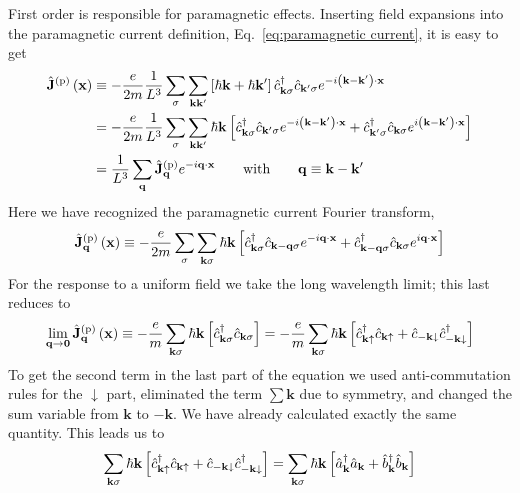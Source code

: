 First order is responsible for paramagnetic effects. Inserting field expansions into the paramagnetic current definition, Eq.~\eqref{eq:paramagnetic current}, it is easy to get
\[
\begin{aligned}
	\hat{\mathbf{J}}^{(\mathrm{p})} \lrR{\mathbf{x}} &\equiv - \frac{e}{2m} \frac{1}{L^3} \sum_\sigma \sum_{\mathbf{k}\mathbf{k}'} 
	\lrS{ \hbar\mathbf{k} + \hbar\mathbf{k}' } \hat{c}_{\mathbf{k}\sigma}^\dagger \hat{c}_{\mathbf{k}'\sigma}
	e^{- i \lrR{\mathbf{k} - \mathbf{k}'} \cdot \mathbf{x}} \\
	&= - \frac{e}{2m} \frac{1}{L^3} \sum_\sigma \sum_{\mathbf{k}\mathbf{k}'} 
	\hbar\mathbf{k}
	\lrS{
		\hat{c}_{\mathbf{k}\sigma}^\dagger \hat{c}_{\mathbf{k}'\sigma}
	 	e^{- i \lrR{\mathbf{k} - \mathbf{k}'} \cdot \mathbf{x}} + \hat{c}_{\mathbf{k}'\sigma}^\dagger \hat{c}_{\mathbf{k}\sigma}
	 	e^{i \lrR{\mathbf{k} - \mathbf{k}'} \cdot \mathbf{x}}
 	} \\
	&= \frac{1}{L^3} \sum_\mathbf{q}
	\hat{\mathbf{J}}^{(\mathrm{p})}_\mathbf{q} e^{- i \mathbf{q} \cdot \mathbf{x}} \quad\qq{with}\quad
	\mathbf{q} \equiv \mathbf{k} - \mathbf{k}'
\end{aligned}
\]
Here we have recognized the paramagnetic current Fourier transform,
\[
	\hat{\mathbf{J}}^{(\mathrm{p})}_\mathbf{q} \left({\mathbf{x}}\right) \equiv - \frac{e}{2m} \sum_\sigma \sum_{\mathbf{k}\sigma} 
	\hbar\mathbf{k} \left[{
		\hat{c}_{\mathbf{k}\sigma}^\dagger \hat{c}_{\mathbf{k}-\mathbf{q}\sigma}
		e^{- i \mathbf{q} \cdot \mathbf{x}} + \hat{c}_{\mathbf{k}-\mathbf{q}\sigma}^\dagger \hat{c}_{\mathbf{k}\sigma}
		e^{i \mathbf{q} \cdot \mathbf{x}}
	}\right]
\]
For the response to a uniform field we take the long wavelength limit; this last reduces to
\[
	\lim_{\mathbf{q}\to\mathbf{0}} \hat{\mathbf{J}}^{(\mathrm{p})}_\mathbf{q} \left({\mathbf{x}}\right) \equiv - \frac{e}{m} \sum_{\mathbf{k}\sigma} 
	\hbar\mathbf{k} \left[{ \hat{c}_{\mathbf{k}\sigma}^\dagger \hat{c}_{\mathbf{k}\sigma} }\right] = - \frac{e}{m} \sum_{\mathbf{k}\sigma} 
	\hbar\mathbf{k} \left[{ 
		\hat{c}_{\mathbf{k}\uparrow}^\dagger \hat{c}_{\mathbf{k}\uparrow} + \hat{c}_{-\mathbf{k}\downarrow} \hat{c}_{-\mathbf{k}\downarrow}^\dagger
	}\right] 
\]
To get the second term in the last part of the equation we used anti-commutation rules for the $\downarrow$ part, eliminated the term $\sum\mathbf{k}$ due to symmetry, and changed the sum variable from $\mathbf{k}$ to $-\mathbf{k}$. We have already calculated exactly the same quantity. This leads us to
\[
	\sum_{\mathbf{k}\sigma} 
	\hbar\mathbf{k} \left[{ 
		\hat{c}_{\mathbf{k}\uparrow}^\dagger \hat{c}_{\mathbf{k}\uparrow} + \hat{c}_{-\mathbf{k}\downarrow} \hat{c}_{-\mathbf{k}\downarrow}^\dagger
	}\right] = \sum_{\mathbf{k}\sigma} 
	\hbar\mathbf{k} \left[{ 
		\hat{a}_\mathbf{k}^\dagger \hat{a}_\mathbf{k} + \hat{b}_\mathbf{k}^\dagger \hat{b}_\mathbf{k}
	}\right]
\]
